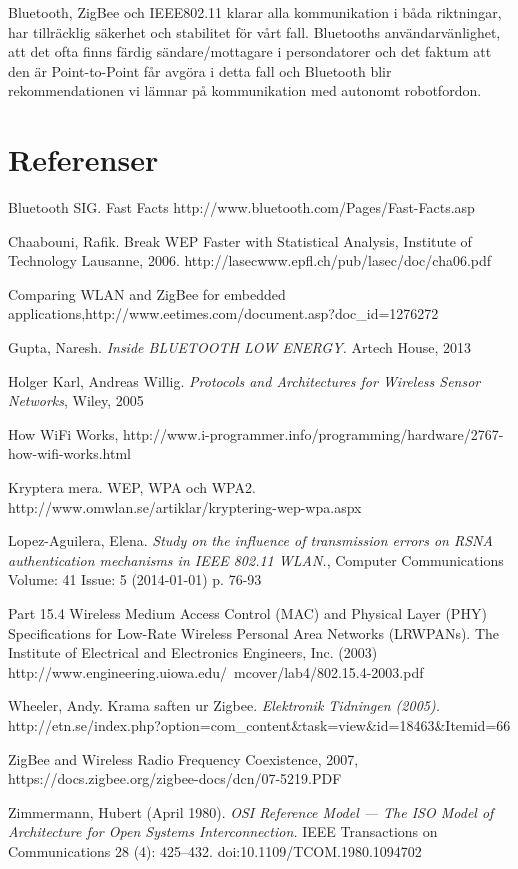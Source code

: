 \documentclass[a4paper,12pt,fleqn]{article}
\begin{document}
Bluetooth, ZigBee och IEEE802.11 klarar alla kommunikation i båda riktningar, har tillräcklig säkerhet och stabilitet för vårt fall. Bluetooths användarvänlighet, att det ofta finns färdig sändare/mottagare i persondatorer och det faktum att den är Point-to-Point får avgöra i detta fall och Bluetooth blir rekommendationen vi lämnar på kommunikation med autonomt robotfordon.

\newpage 
\section*{Referenser}

Bluetooth SIG. Fast Facts http://www.bluetooth.com/Pages/Fast-Facts.asp 

Chaabouni, Rafik. Break WEP Faster with Statistical Analysis, Institute of Technology Lausanne, 2006. http://lasecwww.epfl.ch/pub/lasec/doc/cha06.pdf

Comparing WLAN and ZigBee for embedded applications,http://www.eetimes.com/document.asp?doc\_id=1276272

Gupta, Naresh. \emph{Inside BLUETOOTH LOW ENERGY.} Artech House, 2013

Holger Karl, Andreas Willig. \emph{Protocols and Architectures for Wireless Sensor Networks}, Wiley, 2005

How WiFi Works, http://www.i-programmer.info/programming/hardware/2767-how-wifi-works.html

Kryptera mera. WEP, WPA och WPA2. http://www.omwlan.se/artiklar/kryptering-wep-wpa.aspx 

Lopez-Aguilera, Elena. \emph{Study on the influence of transmission errors on RSNA authentication mechanisms in IEEE 802.11 WLAN.}, Computer Communications Volume: 41 Issue: 5 (2014-01-01) p. 76-93

Part 15.4 Wireless Medium Access Control (MAC) and Physical Layer (PHY) Specifications for Low-Rate Wireless Personal Area Networks (LR\text{-}WPANs). The Institute of Electrical and Electronics Engineers, Inc. (2003) \\ http://www.engineering.uiowa.edu/~mcover/lab4/802.15.4-2003.pdf

Wheeler, Andy. Krama saften ur Zigbee. \emph{Elektronik Tidningen (2005).} \\ http://etn.se/index.php?option=com\_content\&task=view\&id=18463\&Itemid=66

ZigBee and Wireless Radio
Frequency Coexistence, 2007, https://docs.zigbee.org/zigbee-docs/dcn/07-5219.PDF

Zimmermann, Hubert (April 1980).\emph{ OSI Reference Model — The ISO Model of Architecture for Open Systems Interconnection.} IEEE Transactions on Communications 28 (4): 425–432. doi:10.1109/TCOM.1980.1094702
\end{document}
